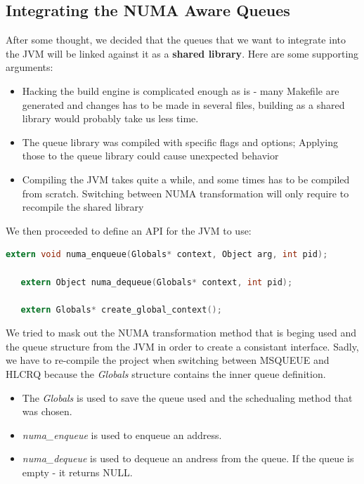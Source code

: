 \documentclass{article}
\begin{document}
 \newpage

 \subsection{Integrating the NUMA Aware Queues} \label{queues:integration}
 After some thought, we decided that the queues that we want to integrate into the JVM will be linked against it as a \textbf{shared library}. Here are some supporting arguments:
 \begin{itemize}
   \item Hacking the build engine is complicated enough as is - many Makefile are generated and changes has to be made in several files, building as a shared library would probably take us less time.
   \item The queue library was compiled with specific flags and options; Applying those to the queue library could cause unexpected behavior
   \item Compiling the JVM takes quite a while, and some times has to be compiled from scratch. Switching between NUMA transformation will only require to recompile the shared library
 \end{itemize}

 We then proceeded to define an API for the JVM to use:
 \begin{lstlisting}[language=C]
   extern void numa_enqueue(Globals* context, Object arg, int pid);

   extern Object numa_dequeue(Globals* context, int pid);
   
   extern Globals* create_global_context();
 \end{lstlisting}

 We tried to mask out the NUMA transformation method that is beging used and the queue structure from the JVM in order to create a consistant interface. Sadly, we have to re-compile the project when switching between MSQUEUE and HLCRQ because the \textit{Globals} structure contains the inner queue definition.

 \begin{itemize}
   \item The \textit{Globals} is used to save the queue used and the schedualing method that was chosen.
   \item \textit{numa\_enqueue} is used to enqueue an address.
   \item \textit{numa\_dequeue} is used to dequeue an andress from the queue. If the queue is empty - it returns NULL.
 \end{itemize}
\end{document}
